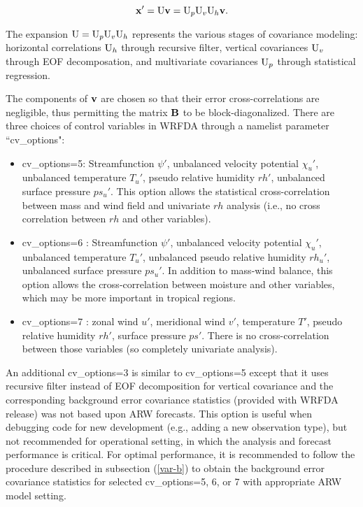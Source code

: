 \begin{equation}
{\bf x}' = {\rm U}{\bf v}= {\rm U}_{p} {\rm U}_{v} {\rm U}_{h}{\bf v}.
\label{var-cv}
\end{equation}

The expansion ${\rm U}={\rm U}_{p} 
{\rm U}_{v} {\rm U}_{h}$ represents the various stages of covariance modeling: horizontal correlations ${\rm U}_{h}$ through 
recursive filter, vertical covariances ${\rm U}_{v}$ through EOF decomposation, and multivariate covariances
${\rm U}_{p}$ through statistical regression.

The components of ${\bf v}$ are chosen so that their error cross-correlations are negligible, 
thus permitting the matrix ${\bf B}$ to be block-diagonalized. There are three choices of control variables in WRFDA
through a namelist parameter ``cv\_options":
\begin{itemize}\setlength{\parskip}{-4pt}
\item
 cv\_options=5: Streamfunction $\psi'$, unbalanced velocity potential $\chi_u'$, 
unbalanced temperature $T_u'$, pseudo relative humidity $rh'$, unbalanced surface pressure $ps_u'$. 
This option allows the statistical cross-correlation between mass and wind field and univariate $rh$ analysis 
(i.e., no cross correlation between $rh$ and other variables).

\item
 cv\_options=6 \citep{chen13}: Streamfunction $\psi'$, unbalanced velocity potential $\chi_u'$, 
unbalanced temperature $T_u'$, unbalanced pseudo relative humidity $rh_u'$, unbalanced surface pressure $ps_u'$.
In addition to mass-wind balance, this option allows the cross-correlation between moisture and other variables, which
may be more important in tropical regions.

\item
 cv\_options=7 \citep{sun15}: zonal wind $u'$, meridional wind $v'$, temperature $T'$, pseudo relative humidity $rh'$, 
 surface pressure $ps'$. There is no cross-correlation between those variables (so completely univariate analysis).
\end{itemize}

An additional cv\_options=3 is similar to cv\_options=5 except that it uses recursive filter instead of EOF decomposition
for vertical covariance and the corresponding background error covariance statistics (provided with WRFDA release) 
was not based upon ARW forecasts.
This option is useful when debugging code for new development (e.g., adding a new observation type), but not recommended 
for operational setting, in which the analysis and forecast performance is critical.
For optimal performance, it is recommended to follow the procedure described in subsection (\ref{var-b}) to
obtain the background error covariance statistics for selected cv\_options=5, 6, or 7 with appropriate ARW model setting.

